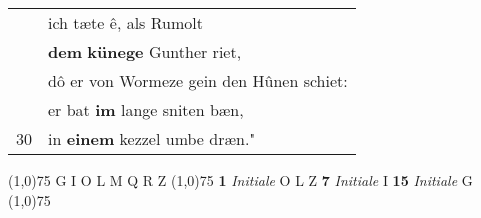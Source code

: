 \documentclass[8pt,a4paper,notitlepage]{article}
\begin{document}
\begin{table}[ht]
\begin{minipage}[t]{0.5\linewidth}
\begin{tabular}{rl}
 & ich tæte ê, als Rumolt\\ 
 & \textbf{dem} \textbf{künege} Gunther riet,\\ 
 & dô er von Wormeze gein den Hûnen schiet:\\ 
 & er bat \textbf{im} lange sniten bæn,\\ 
30 & in \textbf{einem} kezzel umbe dræn."\\ 
\end{tabular}
\scriptsize
\line(1,0){75} \newline
G I O L M Q R Z \newline
\line(1,0){75} \newline
\textbf{1} \textit{Initiale} O L Z  \textbf{7} \textit{Initiale} I  \textbf{15} \textit{Initiale} G  \newline
\line(1,0){75} \newline

\end{minipage}
\end{table}
\end{document}
